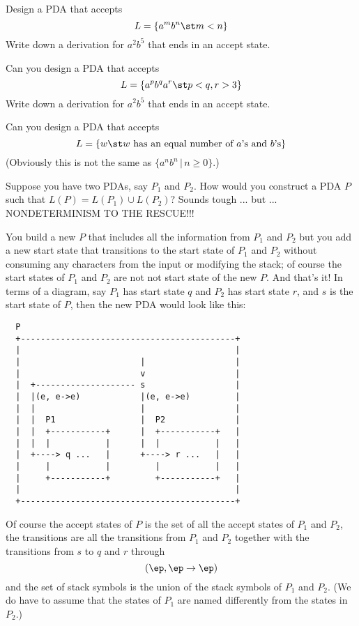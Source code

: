 \newpage
\begin{ex}
Design a PDA that accepts
\[
L = \{ a^m b^{n} \st m < n \}
\]
Write down a derivation for $a^2 b^5$ that ends in an accept state.
\end{ex}



\newpage
\begin{ex}
Can you design a PDA that accepts
\[
L = \{ a^p b^q a^r \st p < q, r > 3 \}
\]
Write down a derivation for $a^2 b^5$ that ends in an accept state.
\end{ex}


\newpage
\begin{ex}
Can you design a PDA that accepts
\[
L = \{ w \st w \text{ has an equal number of $a$'s and $b$'s} \}
\]
(Obviously this is not the same as
$\{a^n b^n \,|\, n \geq 0\}$.)
\end{ex}


\newpage
\begin{eg}
Suppose you have two PDAs, say $P_1$ and $P_2$.
How would you construct a PDA $P$ such that $L(P) = L(P_1) \cup L(P_2)$?
Sounds tough ... but ... NONDETERMINISM TO THE RESCUE!!!

You build a new $P$ that includes all the information from $P_1$ and $P_2$
but you add a new start state that transitions to the start state of $P_1$
and $P_2$ without consuming any characters from the input or modifying the
stack; of course the start states of $P_1$ and $P_2$ are not not start
state of the new $P$.
And that's it! In terms of a diagram, say $P_1$ has start state $q$ and
$P_2$ has start state $r$, and $s$ is the start state of $P$, then the new
PDA would look like this:

\begin{samepage}
\begin{verbatim}
  P
  +-------------------------------------------+
  |                                           |
  |                        |                  |
  |                        v                  |
  |  +-------------------- s                  |
  |  |(e, e->e)            |(e, e->e)         |
  |  |                     |                  |
  |  |  P1                 |  P2              |
  |  |  +-----------+      |  +-----------+   |
  |  |  |           |      |  |           |   |
  |  +----> q ...   |      +----> r ...   |   |
  |     |           |         |           |   |
  |     +-----------+         +-----------+   |
  |                                           |
  +-------------------------------------------+
\end{verbatim}
\end{samepage}

Of course the accept states of $P$ is the set of all the accept states of
$P_1$ and $P_2$, the transitions are all the transitions from $P_1$ and
$P_2$ together with the transitions from $s$ to $q$ and $r$ through
\[
(\ep, \ep \rightarrow \ep)
\]
and the set of stack symbols is the union of the stack symbols of $P_1$
and $P_2$.
(We do have to assume that the states of $P_1$ are named differently from
the states in $P_2$.)
\end{eg}

